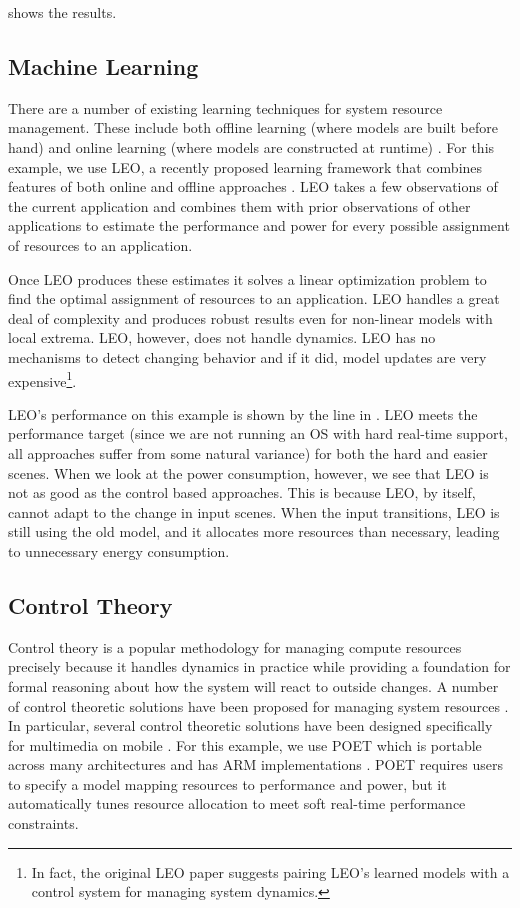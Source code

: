  shows the results. 

\subsection{Machine Learning}
There are a number of existing learning techniques for system resource
management.  These include both offline learning (where models are
built before hand) \cite{} and online learning (where models are
constructed at runtime) \cite{}.  For this example, we use LEO, a
recently proposed learning framework that combines features of both
online and offline approaches \cite{}.  LEO takes a few observations
of the current application and combines them with prior observations
of other applications to estimate the performance and power for every
possible assignment of resources to an application.  

Once LEO produces these estimates it solves a linear optimization
problem to find the optimal assignment of resources to an application.
LEO handles a great deal of complexity and produces robust results
even for non-linear models with local extrema.  LEO, however, does not
handle dynamics.  LEO has no mechanisms to detect changing behavior
and if it did, model updates are very expensive\footnote{In fact, the
  original LEO paper suggests pairing LEO's learned models with a
  control system for managing system dynamics.}.  

LEO's performance on this example is shown by the  line in
.  LEO meets the performance target (since we are not
running an OS with hard real-time support, all approaches suffer from
some natural variance) for both the hard and easier scenes.  When we
look at the power consumption, however, we see that LEO is not as good
as the control based approaches.  This is because LEO, by itself,
cannot adapt to the change in input scenes.  When the input
transitions, LEO is still using the old model, and it allocates more
resources than necessary, leading to unnecessary energy consumption.


\subsection{Control Theory}
Control theory is a popular methodology for managing compute resources
precisely because it handles dynamics in practice while providing a
foundation for formal reasoning about how the system will react to
outside changes.  A number of control theoretic solutions have been
proposed for managing system resources \cite{}.  In particular,
several control theoretic solutions have been designed specifically
for multimedia on mobile \cite{}.  For this example, we use POET which
is portable across many architectures and has ARM implementations
\cite{POET}.  POET requires users to specify a model mapping resources
to performance and power, but it automatically tunes resource
allocation to meet soft real-time performance constraints.

